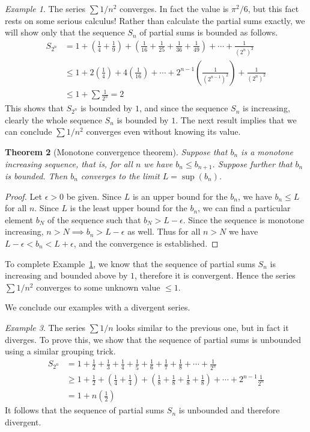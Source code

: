 \documentclass[11pt,oneside]{amsbook}
\theoremstyle{definition}
\theoremstyle{plain}
\newtheorem{theorem}{Theorem}[section]
\theoremstyle{definition}
\theoremstyle{remark}
\newtheorem{example}[theorem]{Example}
\numberwithin{equation}{section}
\numberwithin{figure}{section}
\begin{document}
\begin{example}
  \label{ex:1/n^2}
  The series $\sum1/n^2$ converges. In fact the value is $\pi^2/6$, but this fact rests on some serious calculus! Rather than calculate the partial sums exactly, we will show only that the sequence $S_n$ of partial sums is bounded as follows. 
  \begin{align*}
    S_{2^n}&=1+\left(\frac14+\frac19\right)
             +\left(\frac1{16}+\frac1{25}+\frac1{36}+\frac1{49}\right)
             +\cdots
             +\frac1{(2^n)^2}\\
           &\leq1+2\left(\frac14\right)+4\left(\frac1{16}\right)
             +\cdots+2^{n-1}\left(\frac1{(2^{n-1})^2}\right)+\frac1{(2^n)^2}\\
           &\leq1+\sum\frac1{2^n}=2
  \end{align*}
  This shows that $S_{2^n}$ is bounded by $1$, and since the sequence $S_n$ is increasing, clearly the whole sequence $S_n$ is bounded by $1$. The next result implies that we can conclude $\sum1/n^2$ converges even without knowing its value.
\end{example}

\begin{theorem}[Monotone convergence theorem]
  Suppose that $b_n$ is a monotone increasing sequence, that is, for all $n$ we have $b_n\leq b_{n+1}$. Suppose further that $b_n$ is bounded. Then $b_n$ converges to the limit $L=\sup(b_n)$.
\end{theorem}

\begin{proof}
  Let $\epsilon>0$ be given. Since $L$ is an upper bound for the $b_n$, we have $b_n\leq L$ for all $n$. Since $L$ is the least upper bound for the $b_n$, we can find a particular element $b_N$ of the sequence such that $b_N>L-\epsilon$. Since the sequence is monotone increasing, $n>N\implies b_n>L-\epsilon$ as well. Thus for all $n>N$ we have $L-\epsilon<b_n<L+\epsilon$, and the convergence is established.
\end{proof}

To complete Example~\ref{ex:1/n^2}, we know that the sequence of partial sums $S_n$ is increasing and bounded above by $1$, therefore it is convergent. Hence the series $\sum1/n^2$ converges to some unknown value $\leq1$.

We conclude our examples with a divergent series.

\begin{example}
  The series $\sum 1/n$ looks similar to the previous one, but in fact it diverges. To prove this, we show that the sequence of partial sums is unbounded using a similar grouping trick.
\begin{align*}
  S_{2^n} &= 1+\frac12+\frac13+\frac14+\frac15+\frac16+\frac17+\frac18+
            \cdots+\frac1{2^n}\\
          &\geq 1+\frac12+\left(\frac14+\frac14\right)
            +\left(\frac18+\frac18+\frac18+\frac18\right)
            +\cdots+2^{n-1}\frac1{2^n}\\
          &=1+n\left(\frac12\right)
\end{align*}
It follows that the sequence of partial sums $S_n$ is unbounded and therefore divergent.
\end{example}
\end{document}
